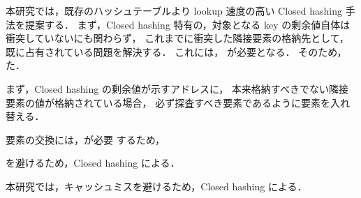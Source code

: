 本研究では，既存のハッシュテーブルより lookup 速度の高い Closed hashing 手法を提案する．
まず，Closed hashing 特有の，対象となる key の剰余値自体は衝突していないにも関わらず，
これまでに衝突した隣接要素の格納先として，既に占有されている問題を解決する．
これには，
が必要となる．
そのため，た．

まず，Closed hashing の剰余値が示すアドレスに，
本来格納すべきでない隣接要素の値が格納されている場合，
必ず探査すべき要素であるように要素を入れ替える．



要素の交換には，が必要
するため，

を避けるため，Closed hashing による．

本研究では，キャッシュミスを避けるため，Closed hashing による．






